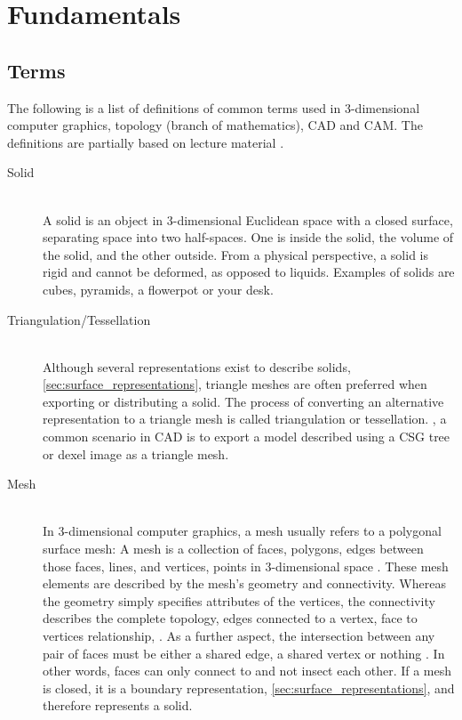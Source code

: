 \chapter{Fundamentals} %
\label{ch:fundamentals}

\section{Terms}
\label{sec:definitions}

The following is a list of definitions of common terms used in 3-dimensional computer graphics, topology (branch of mathematics), CAD and CAM. The definitions are partially based on lecture material \cite{mesh_basics, mesh_lecture10}.

\begin{description}

	\item[Solid] \hfill \\
	A solid is an object in 3-dimensional Euclidean space with a closed surface, separating space into two half-spaces.
	One is inside the solid, the volume of the solid, and the other outside.
	From a physical perspective, a solid is rigid and cannot be deformed, as opposed to \eg liquids.
	Examples of solids are cubes, pyramids, a flowerpot or your desk.


	\item[Triangulation/Tessellation] \hfill \\
	Although several representations exist to describe solids, \cf \cref{sec:surface_representations}, triangle meshes are often preferred when exporting or distributing a solid.
	The process of converting an alternative representation to a triangle mesh is called triangulation or tessellation.
	\Eg, a common scenario in CAD is to export a model described using a CSG tree or dexel image as a triangle mesh.




	\item[Mesh] \hfill \\
	In 3-dimensional computer graphics, a mesh usually refers to a polygonal surface mesh:
	A mesh is a collection of faces, \ie polygons, edges between those faces, \ie lines, and vertices, \ie points in 3-dimensional space \cite{mesh_basics}.
	These mesh elements are described by the mesh's geometry and connectivity.
	Whereas the geometry simply specifies attributes of the vertices, the connectivity describes the complete topology, \eg edges connected to a vertex, face to vertices relationship, \etc.
	As a further aspect, the intersection between any pair of faces must be either a shared edge, a shared vertex or nothing \cite{mesh_lecture10}.
	In other words, faces can only connect to and not insect each other.
	If a mesh is closed, it is a boundary representation, \cf \cref{sec:surface_representations}, and therefore represents a solid.


\end{description}
